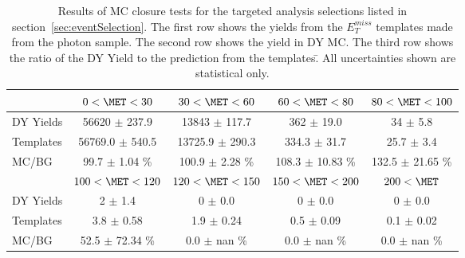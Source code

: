 \begin{table}[htb]
\scriptsize
\begin{center}
\caption{\label{table:targeted} Results of MC closure tests for the targeted analysis selections listed in section~\ref{sec:eventSelection}. The first row shows the yields from the $E^{miss}_T$ templates made from the photon sample. The second row shows the yield in DY MC. The third row shows the ratio of the DY Yield to the prediction from the templates.̄ All uncertainties shown are statistical only. }
\begin{tabular}{l|c|c|c|c}
\hline
\hline
          & $0 < \MET < 30$  & $30 < \MET < 60$  & $60 < \MET < 80$  & $80 < \MET < 100$  \\ 
\hline
DY Yields & 56620 $\pm$ 237.9 & 13843 $\pm$ 117.7 &   362 $\pm$ 19.0 &     34 $\pm$ 5.8 \\
Templates & 56769.0 $\pm$ 540.5 & 13725.9 $\pm$ 290.3 & 334.3 $\pm$ 31.7 &  25.7 $\pm$ 3.4 \\
    MC/BG & 99.7 $\pm$ 1.04 \% & 100.9 $\pm$ 2.28 \% & 108.3 $\pm$ 10.83 \% & 132.5 $\pm$ 21.65 \% \\
\hline
\hline
          & $100 < \MET < 120$  & $120 < \MET < 150$  & $150 < \MET < 200$  &    $200 < \MET$  \\ 
\hline
DY Yields &      2 $\pm$ 1.4 &      0 $\pm$ 0.0 &      0 $\pm$ 0.0 &      0 $\pm$ 0.0 \\
Templates &   3.8 $\pm$ 0.58 &   1.9 $\pm$ 0.24 &   0.5 $\pm$ 0.09 &   0.1 $\pm$ 0.02 \\
    MC/BG & 52.5 $\pm$ 72.34 \% & 0.0 $\pm$ nan \% & 0.0 $\pm$ nan \% & 0.0 $\pm$ nan \% \\
\hline
\hline
\end{tabular}
\end{center}
\end{table}

\clearpage
